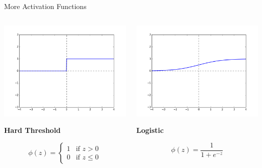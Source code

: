 \documentclass[handout,aspectratio=169]{beamer}
\begin{document}
\begin{frame}{More Activation Functions}
  \begin{columns}
    \begin{column}{0.3 \linewidth}
      \includegraphics[width=\linewidth]{pics/act_threshold.png}
      \begin{center}
        {\bf Hard Threshold}
      \end{center}
      \[ \phi(z) = \left\{ \begin{array}{ll} 1 & \textrm{if } z > 0 \\ 0 & \textrm{if } z \leq 0 \end{array} \right. \]
    \end{column}

    \begin{column}{0.3 \linewidth}
      \includegraphics[width=\linewidth]{pics/act_logistic.png}
      \begin{center}
        {\bf Logistic}
      \end{center}
      \[ \phi(z) = \frac{1}{1+e^{-z}} \]
    \end{column}


\end{columns}
\end{frame}
\end{document}
